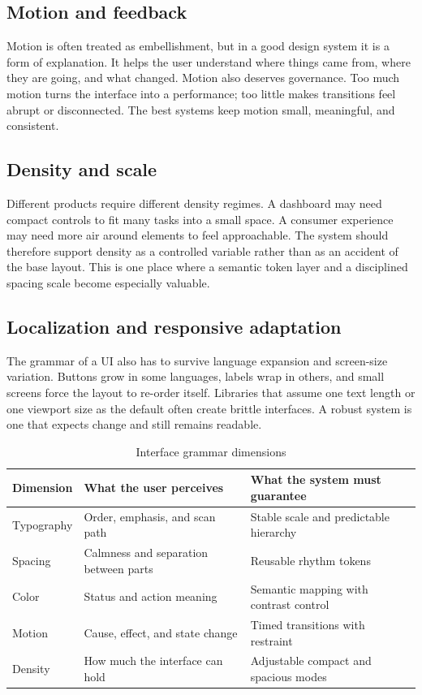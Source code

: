 \documentclass[11pt,twoside,a4paper]{article}
\begin{document}
\subsection{Motion and feedback}
Motion is often treated as embellishment, but in a good design system it is a form of explanation. It helps the user understand where things came from, where they are going, and what changed. Motion also deserves governance. Too much motion turns the interface into a performance; too little makes transitions feel abrupt or disconnected. The best systems keep motion small, meaningful, and consistent.

\subsection{Density and scale}
Different products require different density regimes. A dashboard may need compact controls to fit many tasks into a small space. A consumer experience may need more air around elements to feel approachable. The system should therefore support density as a controlled variable rather than as an accident of the base layout. This is one place where a semantic token layer and a disciplined spacing scale become especially valuable.

\subsection{Localization and responsive adaptation}
The grammar of a UI also has to survive language expansion and screen-size variation. Buttons grow in some languages, labels wrap in others, and small screens force the layout to re-order itself. Libraries that assume one text length or one viewport size as the default often create brittle interfaces. A robust system is one that expects change and still remains readable.

\begin{table}[htbp]
  \centering
  \caption{Interface grammar dimensions}
  \begin{tabularx}{\textwidth}{@{}p{}Y Y@{}}
    \toprule
    \textbf{Dimension} & \textbf{What the user perceives} & \textbf{What the system must guarantee} \\
    \midrule
    Typography & Order, emphasis, and scan path & Stable scale and predictable hierarchy \\
    Spacing & Calmness and separation between parts & Reusable rhythm tokens \\
    Color & Status and action meaning & Semantic mapping with contrast control \\
    Motion & Cause, effect, and state change & Timed transitions with restraint \\
    Density & How much the interface can hold & Adjustable compact and spacious modes \\
    \bottomrule
  \end{tabularx}
\end{table}
\end{document}
